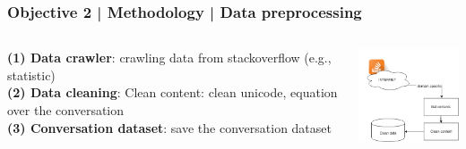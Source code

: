 \documentclass{beamer}
\begin{document}
\begin{frame}
\frametitle{Objective 2 | Methodology | Data preprocessing}



\begin{columns}
	
	\begin{column}{.55\textwidth}
\textbf{	(1) Data crawler}: crawling data from stackoverflow (e.g., statistic)\\

\textbf{	(2) Data cleaning}: Clean content: clean unicode, equation over the conversation\\
\textbf{	(3) Conversation dataset}: save the conversation dataset\\
	\end{column}
	\begin{column}{.45\textwidth}
		\includegraphics[width=40mm]{dsf.png}
	\end{column}
	

\end{columns}
\begin{center}
	
\end{center}



\end{frame}
\end{document}
